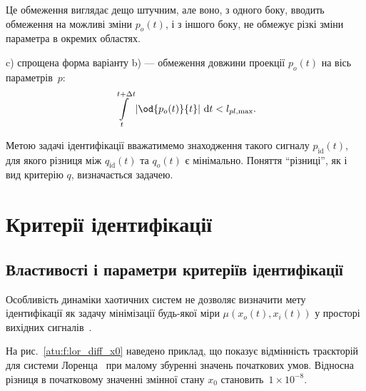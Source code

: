 Це обмеження виглядає дещо штучним, але воно, з одного боку,
вводить обмеження на можливі зміни
$ p_o (t) $, і з іншого боку, не обмежує різкі зміни параметра в
окремих областях.

c) спрощена форма варіанту b) --- обмеження довжини проекції
$ p_o (t) $ на вісь параметрів~$p$:
%
\begin{equation}
  \int\limits_{t}^{t+\Delta t} \left| \od{p_o(t)}{t} \right | \, \mathrm{d}t < l_{pl,\max}.
  \label{atu:eq:p_lim_pl}
\end{equation}

Метою задачі ідентифікації вважатимемо знаходження такого
сигналу
$ p_\mathrm{id}(t) $, для якого різниця
між $ q_\mathrm{id}(t) $ та
$q_o(t) $\label{atu:d:q_o} є мінімально. Поняття ``різниці'', як і вид критерію
$q$, визначається задачею.


\section{Критерії ідентифікації} %

\subsection{Властивості і параметри критеріїв ідентифікації} %

Особливість динаміки хаотичних систем не дозволяє визначити мету ідентифікації
як задачу мінімізації будь-якої міри
$\mu(x_o(t), x_i(t))$ у просторі вихідних
сигналів~\cite{atu_asau11,atu_asau12,atu_asau14,atu_electronika2013}.


На рис.~\ref{atu:f:lor_diff_x0} наведено приклад, що показує відмінність
траєкторій для системи Лоренца~\cite{moon_chaotic_vibr} при малому збуренні
значень початкових умов. Відносна різниця в початковому
значенні змінної стану
$x_0$ становить~$1 \times 10^{-8}$.

